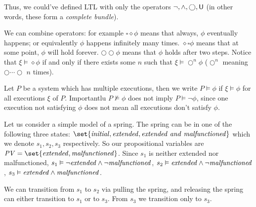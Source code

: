 Thus, we could've defined LTL with only the operators $\neg,\land,\bigcirc,{\sf U}$ (in other words, these form a {\it complete bundle}).

We can combine operators: for example $\square\diamond\phi$ means that always, $\phi$ eventually happens; or equivalently $\phi$ happens infinitely many times.
$\diamond\square\phi$ means that at some point, $\phi$ will hold forever.
$\bigcirc\bigcirc\phi$ means that $\phi$ holds after two steps.
Notice that $\xi\vDash\diamond\phi$ if and only if there exists some $n$ such that $\xi\vDash\bigcirc^n\phi$ ($\bigcirc^n$ meaning $\bigcirc\cdots\bigcirc$ $n$ times).

Let $P$ be a system which has multiple executions, then we write $P\vDash\phi$ if $\xi\vDash\phi$ for all executions $\xi$ of $P$.
Importantlu $P\nvDash\phi$ does not imply $P\vDash\neg\phi$, since one execution not satisfying $\phi$ does not mean all executions don't satisfy $\phi$.

\bexam

    \def\mal{{\it malfunctioned}}\def\ext{{\it extended}}
    Let us consider a simple model of a spring.
    The spring can be in one of the following three states: $\set{{\it initial},{\it extended},{\it extended\ and\ malfunctioned}}$ which we denote $s_1,s_2,s_3$ respectively.
    So our propositional variables are $\PV=\set{\ext,\mal}$.
    Since $s_1$ is neither extended nor malfunctioned, $s_1\vDash\neg\ext\land\neg\mal$, $s_2\vDash\ext\land\neg\mal$, $s_3\vDash\ext\land\mal$.

    We can transition from $s_1$ to $s_2$ via pulling the spring, and releasing the spring can either transition to $s_1$ or to $s_3$.
    From $s_3$ we transition only to $s_3$.

